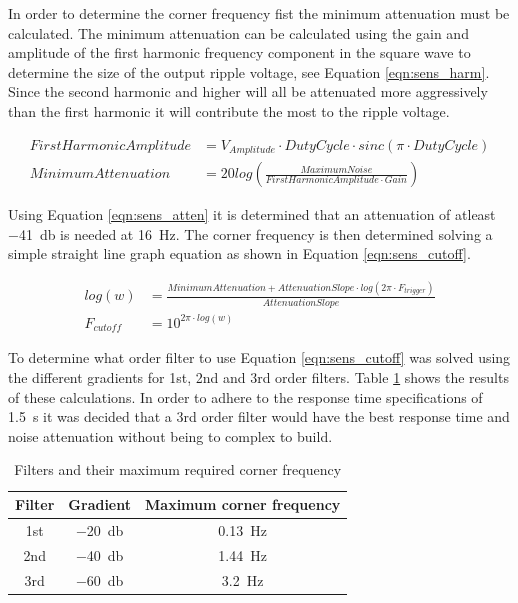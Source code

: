 In order to determine the corner frequency fist the minimum attenuation must be calculated. The minimum attenuation can be calculated using the gain and amplitude of the first harmonic frequency component in the square wave to determine the size of the output ripple voltage, see Equation \ref{eqn:sens_harm}. Since the second harmonic and higher will all be attenuated more aggressively than the first harmonic it will contribute the most to the ripple voltage. 

\begin{align}
First Harmonic Amplitude &= V_{Amplitude} \cdot DutyCycle \cdot sinc(\pi \cdot DutyCycle)\label{eqn:sens_harm}\\
MinimumAttenuation &= 20log(\frac{MaximumNoise}{FirstHarmonicAmplitude \cdot Gain})\label{eqn:sens_atten}
\end{align}

Using Equation \ref{eqn:sens_atten} it is determined that an attenuation of atleast \SI{-41}{\decibel} is needed at \SI{16}{\hertz}. The corner frequency is then determined solving a simple straight line graph equation as shown in Equation \ref{eqn:sens_cutoff}.

\begin{align}
log(w) &= \frac{MinimumAttenuation+AttenuationSlope \cdot log(2\pi \cdot F_{trigger})}{AttenuationSlope}\\
F_{cutoff} &= 10^{2\pi \cdot log(w)}\label{eqn:sens_cutoff}
\end{align}

To determine what order filter to use Equation \ref{eqn:sens_cutoff} was solved using the different gradients for 1st, 2nd and 3rd order filters. Table \ref{tbl:sens_cutoff} shows the results of these calculations. In order to adhere to the response time specifications of \SI{1.5}{\second} it was decided that a 3rd order filter would have the best response time and noise attenuation without being to complex to build. 

\begin{table}\label{tbl:sens_cutoff}
\begin{center}
\begin{tabular}{|c|c|c|}
\hline
Filter & Gradient & Maximum corner frequency\\
\hline
1st & \SI{-20}{\decibel} & \SI{0.13}{\hertz}\\
2nd & \SI{-40}{\decibel} & \SI{1.44}{\hertz}\\
3rd & \SI{-60}{\decibel} & \SI{3.2}{\hertz}\\
\hline
\end{tabular}
\end{center}
\caption{Filters and their maximum required corner frequency}
\end{table}

